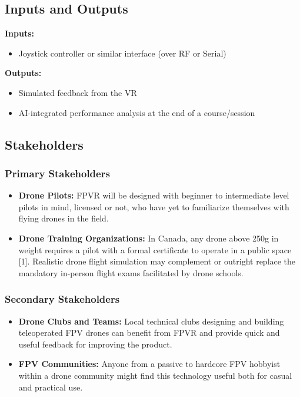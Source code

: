\documentclass{article}
\begin{document}
\subsection{Inputs and Outputs}

\textbf{Inputs:}
\begin{itemize}
    \item Joystick controller or similar interface (over RF or Serial)
\end{itemize}
\textbf{Outputs:}
\begin{itemize}
    \item Simulated feedback from the VR
    \item AI-integrated performance analysis at the end of a course/session
\end{itemize}

\subsection{Stakeholders}
\subsubsection{Primary Stakeholders}
\begin{itemize}
    \item \textbf{Drone Pilots:} FPVR will be designed with beginner to intermediate
    level pilots in mind, licensed or not, who have yet to familiarize themselves with flying drones
    in the field.
    \item \textbf{Drone Training Organizations:} In Canada, any drone above 250g in weight
    requires a pilot with a formal certificate to operate in a public space [1]. 
    Realistic drone flight simulation may complement or outright replace the 
    mandatory in-person flight exams facilitated by drone schools.
\end{itemize}

\subsubsection{Secondary Stakeholders}
\begin{itemize}
    \item \textbf{Drone Clubs and Teams:} Local technical clubs designing and building
    teleoperated FPV drones can benefit from FPVR and provide quick and useful feedback for improving
    the product. 
    \item \textbf{FPV Communities:} Anyone from a passive to hardcore FPV hobbyist
    within a drone community might find this technology useful both for casual and practical use. 
\end{itemize}
\end{document}
